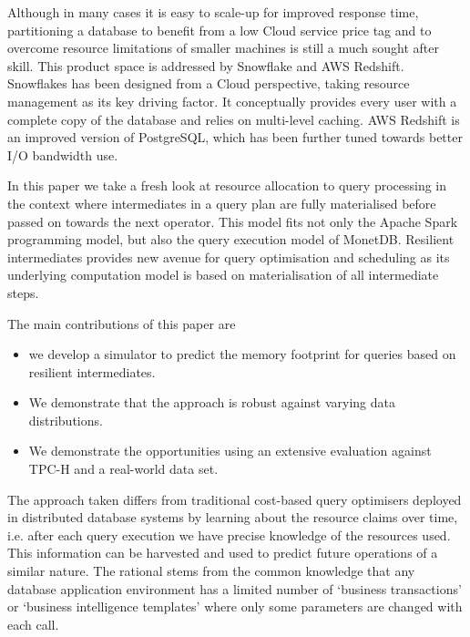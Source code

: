 \documentclass[conference]{IEEEtran}
\begin{document}

Although in many cases it is easy to scale-up for improved response time, partitioning a database to benefit from a low Cloud service price tag and to overcome resource limitations of smaller machines is still a much sought after skill.
This product space is addressed by Snowflake and AWS Redshift.
Snowflakes has been designed from a Cloud perspective, taking resource management as its key driving factor.
It conceptually provides every user with a complete copy of the database and relies on multi-level caching.
AWS Redshift is an improved version of PostgreSQL, which has been further tuned towards better I/O bandwidth use.

In this paper we take a fresh look at resource allocation to query processing in the context where intermediates in a query plan are fully materialised before passed on towards the next operator.
This model fits not only the Apache Spark programming model, but also the query execution model of MonetDB.
Resilient intermediates provides new avenue for query optimisation and scheduling as its underlying computation model is based on materialisation of all intermediate steps.

The main contributions of this paper are
\begin{itemize}
	\item we develop a simulator to predict the memory footprint for queries based on resilient intermediates.
	\item We demonstrate that the approach is robust against varying data distributions.
	\item We demonstrate the opportunities using an extensive evaluation against TPC-H and a real-world data set.
\end{itemize}

The approach taken differs from traditional cost-based query optimisers deployed in distributed database systems by learning about the resource claims over time, i.e. after each query execution we have precise knowledge of the resources used.
This information can be harvested and used to predict future operations of a similar nature.
The rational stems from the common knowledge that any database application environment has a limited number of `business transactions' or `business intelligence templates' where only some parameters are changed with each call.
\end{document}
